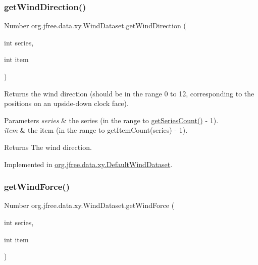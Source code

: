 \subsubsection{\texorpdfstring{get\+Wind\+Direction()}{getWindDirection()}}
{\footnotesize\ttfamily Number org.\+jfree.\+data.\+xy.\+Wind\+Dataset.\+get\+Wind\+Direction (\begin{DoxyParamCaption}\item[{int}]{series,  }\item[{int}]{item }\end{DoxyParamCaption})}

Returns the wind direction (should be in the range 0 to 12, corresponding to the positions on an upside-\/down clock face).


\begin{DoxyParams}{Parameters}
{\em series} & the series (in the range {} to {\ttfamily \mbox{\hyperlink{interfaceorg_1_1jfree_1_1data_1_1general_1_1_series_dataset_a84fe822f5918f941d9de1ed1b73c9f58}{get\+Series\+Count()}} -\/ 1}). \\
\hline
{\em item} & the item (in the range {} to {\ttfamily get\+Item\+Count(series) -\/ 1}).\\
\hline
\end{DoxyParams}
\begin{DoxyReturn}{Returns}
The wind direction. 
\end{DoxyReturn}


Implemented in \mbox{\hyperlink{classorg_1_1jfree_1_1data_1_1xy_1_1_default_wind_dataset_aa548182054c24afc0a4e2ac429fe81e9}{org.\+jfree.\+data.\+xy.\+Default\+Wind\+Dataset}}.

\mbox{\label{interfaceorg_1_1jfree_1_1data_1_1xy_1_1_wind_dataset_aae53f6715a54e1f6b34e2b7d19564463}} 
\subsubsection{\texorpdfstring{get\+Wind\+Force()}{getWindForce()}}
{\footnotesize\ttfamily Number org.\+jfree.\+data.\+xy.\+Wind\+Dataset.\+get\+Wind\+Force (\begin{DoxyParamCaption}\item[{int}]{series,  }\item[{int}]{item }\end{DoxyParamCaption})}

